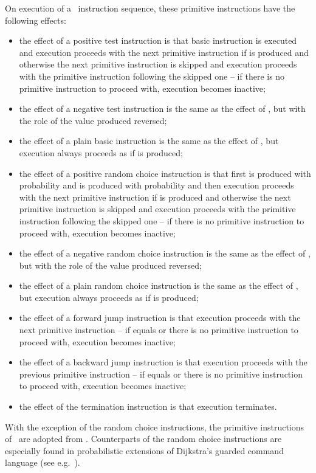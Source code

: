 \documentclass{llncs}
\begin{document}
On execution of a \prPGLB\ instruction sequence, these primitive
instructions have the following effects:
\begin{itemize}
\item
the effect of a positive test instruction  is that basic
instruction  is executed and execution proceeds with the next
primitive instruction if  is produced and otherwise the next
primitive instruction is skipped and execution proceeds with the
primitive instruction following the skipped one -- if there is no
primitive instruction to proceed with, execution becomes inactive;
\item
the effect of a negative test instruction  is the same as the
effect of , but with the role of the value produced reversed;
\item
the effect of a plain basic instruction  is the same as the effect of
, but execution always proceeds as if  is produced;
\item
the effect of a positive random choice instruction  
is that first  is produced with probability  and  is 
produced with probability  and then execution proceeds with the 
next primitive instruction if  is produced and otherwise the next
primitive instruction is skipped and execution proceeds with the
primitive instruction following the skipped one -- if there is no
primitive instruction to proceed with, execution becomes inactive;
\item
the effect of a negative random choice instruction  
is the same as the effect of , but with the role of 
the value produced reversed;
\item
the effect of a plain random choice instruction  is the 
same as the effect of , but execution always 
proceeds as if  is produced;
\item
the effect of a forward jump instruction  is that execution
proceeds with the  next primitive instruction -- if 
equals  or there is no primitive instruction to proceed with,
execution becomes inactive;
\item
the effect of a backward jump instruction  is that execution
proceeds with the  previous primitive instruction -- if
 equals  or there is no primitive instruction to proceed with,
execution becomes inactive;
\item
the effect of the termination instruction  is that execution 
terminates.
\end{itemize}

With the exception of the random choice instructions, the primitive
instructions of \prPGLB\ are adopted from \PGLB.
Counterparts of the random choice instructions are especially found in
probabilistic extensions of Dijkstra's guarded command language 
(see e.g.~\cite{HSM97a}).
\end{document}
